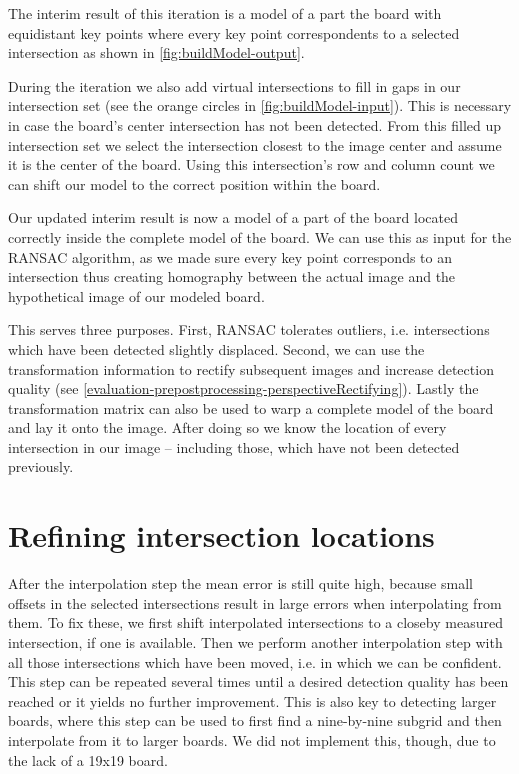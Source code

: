 	The interim result of this iteration is a model of a part the board with equidistant key points where every key point correspondents to a selected intersection as shown in \autoref{fig:buildModel-output}.

	During the iteration we also add virtual intersections to fill in gaps in our intersection set (see the orange circles in \autoref{fig:buildModel-input}). This is necessary in case the board's center intersection has not been detected. From this filled up intersection set we select the intersection closest to the image center and assume it is the center of the board. Using this intersection's row and column count we can shift our model to the correct position within the board.

	Our updated interim result is now a model of a part of the board located correctly inside the complete model of the board. We can use this as input for the RANSAC algorithm\cite{fischler1981random}, as we made sure every key point corresponds to an intersection thus creating homography between the actual image and the hypothetical image of our modeled board.

	This serves three purposes. First, RANSAC tolerates outliers, i.e. intersections which have been detected slightly displaced. Second, we can use the transformation information to rectify subsequent images and increase detection quality (see \autoref{evaluation-prepostprocessing-perspectiveRectifying}). Lastly the transformation matrix can also be used to warp a complete model of the board and lay it onto the image. After doing so we know the location of every intersection in our image -- including those, which have not been detected previously.

	\section{Refining intersection locations}
	\label{detector-postprocessing}
	After the interpolation step the mean error is still quite high, because small offsets in the selected intersections result in large errors when interpolating from them. To fix these, we first shift interpolated intersections to a closeby measured intersection, if one is available. Then we perform another interpolation step with all those intersections which have been moved, i.e. in which we can be confident. This step can be repeated several times until a desired detection quality has been reached or it yields no further improvement. This is also key to detecting larger boards, where this step can be used to first find a nine-by-nine subgrid and then interpolate from it to larger boards. We did not implement this, though, due to the lack of a 19x19 board.

